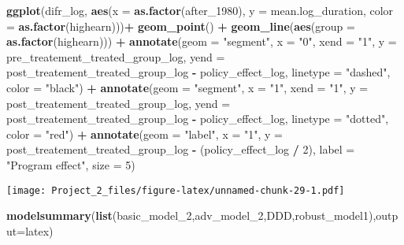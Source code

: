 \documentclass[
]{article}
\newenvironment{Shaded}{\begin{snugshade}}{\end{snugshade}}
\newcommand{\AttributeTok}[1]{\textcolor[rgb]{0.13,0.29,0.53}{#1}}
\newcommand{\DecValTok}[1]{\textcolor[rgb]{0.00,0.00,0.81}{#1}}
\newcommand{\FunctionTok}[1]{\textcolor[rgb]{0.13,0.29,0.53}{\textbf{#1}}}
\newcommand{\NormalTok}[1]{#1}
\newcommand{\SpecialCharTok}[1]{\textcolor[rgb]{0.81,0.36,0.00}{\textbf{#1}}}
\newcommand{\StringTok}[1]{\textcolor[rgb]{0.31,0.60,0.02}{#1}}
\begin{document}
\begin{Shaded}
\begin{Highlighting}[]
\FunctionTok{ggplot}\NormalTok{(difr\_log, }\FunctionTok{aes}\NormalTok{(}\AttributeTok{x =} \FunctionTok{as.factor}\NormalTok{(after\_1980), }
                  \AttributeTok{y =}\NormalTok{ mean.log\_duration, }
                  \AttributeTok{color =} \FunctionTok{as.factor}\NormalTok{(highearn)))}\SpecialCharTok{+}
  \FunctionTok{geom\_point}\NormalTok{() }\SpecialCharTok{+}
  \FunctionTok{geom\_line}\NormalTok{(}\FunctionTok{aes}\NormalTok{(}\AttributeTok{group =} \FunctionTok{as.factor}\NormalTok{(highearn))) }\SpecialCharTok{+}
  \FunctionTok{annotate}\NormalTok{(}\AttributeTok{geom =} \StringTok{"segment"}\NormalTok{, }\AttributeTok{x =} \StringTok{"0"}\NormalTok{, }\AttributeTok{xend =} \StringTok{"1"}\NormalTok{,}
           \AttributeTok{y =}\NormalTok{ pre\_treatement\_treated\_group\_log, }\AttributeTok{yend =} 
\NormalTok{             post\_treatement\_treated\_group\_log }\SpecialCharTok{{-}}\NormalTok{ policy\_effect\_log,}
           \AttributeTok{linetype =} \StringTok{"dashed"}\NormalTok{, }\AttributeTok{color =} \StringTok{"black"}\NormalTok{) }\SpecialCharTok{+}
  \FunctionTok{annotate}\NormalTok{(}\AttributeTok{geom =} \StringTok{"segment"}\NormalTok{, }\AttributeTok{x =} \StringTok{"1"}\NormalTok{, }\AttributeTok{xend =} \StringTok{"1"}\NormalTok{,}
           \AttributeTok{y =}\NormalTok{ post\_treatement\_treated\_group\_log, }\AttributeTok{yend =}
\NormalTok{             post\_treatement\_treated\_group\_log }\SpecialCharTok{{-}}\NormalTok{ policy\_effect\_log,}
           \AttributeTok{linetype =} \StringTok{"dotted"}\NormalTok{, }\AttributeTok{color =} \StringTok{"red"}\NormalTok{) }\SpecialCharTok{+}
  \FunctionTok{annotate}\NormalTok{(}\AttributeTok{geom =} \StringTok{"label"}\NormalTok{, }\AttributeTok{x =} \StringTok{"1"}\NormalTok{, }\AttributeTok{y =}\NormalTok{ post\_treatement\_treated\_group\_log}
           \SpecialCharTok{{-}}\NormalTok{ (policy\_effect\_log }\SpecialCharTok{/} \DecValTok{2}\NormalTok{), }
           \AttributeTok{label =} \StringTok{"Program effect"}\NormalTok{, }\AttributeTok{size =} \DecValTok{5}\NormalTok{)}
\end{Highlighting}
\end{Shaded}

\texttt{[image: Project\_2\_files/figure-latex/unnamed-chunk-29-1.pdf]}

\begin{Shaded}
\begin{Highlighting}[]
\FunctionTok{modelsummary}\NormalTok{(}\FunctionTok{list}\NormalTok{(basic\_model\_2,adv\_model\_2,DDD,robust\_model1),}\AttributeTok{output=}\StringTok{\textquotesingle{}latex\textquotesingle{}}\NormalTok{)}
\end{Highlighting}
\end{Shaded}
\end{document}
